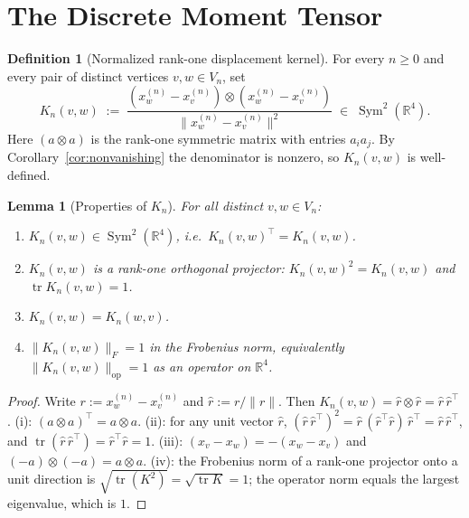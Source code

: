 \documentclass[11pt, a4paper]{amsart}
\newtheorem{lemma}[theorem]{Lemma}
\theoremstyle{definition}
\newtheorem{definition}[theorem]{Definition}
\newcommand{\R}{\mathbb{R}}
\newcommand{\tr}{\operatorname{tr}}
\newcommand{\op}{\operatorname{op}}
\newcommand{\Sym}{\operatorname{Sym}}
\begin{document}
\section{The Discrete Moment Tensor}
\label{sec:moment}

\begin{definition}[Normalized rank-one displacement kernel]
\label{def:kernel}
For every $n \geq 0$ and every pair of distinct vertices
$v, w \in V_n$, set
\[
  K_n(v, w) \;:=\;
    \frac{(x_w^{(n)} - x_v^{(n)}) \otimes
      (x_w^{(n)} - x_v^{(n)})}{\|x_w^{(n)} - x_v^{(n)}\|^2}
  \;\in\; \Sym^2(\R^4).
\]
Here $(a \otimes a)$ is the rank-one symmetric matrix with
entries $a_i a_j$. By Corollary~\ref{cor:nonvanishing} the
denominator is nonzero, so $K_n(v, w)$ is well-defined.
\end{definition}

\begin{lemma}[Properties of $K_n$]
\label{lem:kernel-properties}
For all distinct $v, w \in V_n$:
\begin{enumerate}
\item[\textup{(i)}] $K_n(v, w) \in \Sym^2(\R^4)$, i.e.\
  $K_n(v, w)^\top = K_n(v, w)$.
\item[\textup{(ii)}] $K_n(v, w)$ is a rank-one orthogonal
  projector: $K_n(v, w)^2 = K_n(v, w)$ and
  $\tr K_n(v, w) = 1$.
\item[\textup{(iii)}] $K_n(v, w) = K_n(w, v)$.
\item[\textup{(iv)}] $\|K_n(v, w)\|_F = 1$ in the Frobenius
  norm, equivalently $\|K_n(v, w)\|_\op = 1$ as an operator on
  $\R^4$.
\end{enumerate}
\end{lemma}

\begin{proof}
Write $r := x_w^{(n)} - x_v^{(n)}$ and $\hat r := r / \|r\|$.
Then $K_n(v, w) = \hat r \otimes \hat r = \hat r\,\hat r^\top$.
(i): $(a \otimes a)^\top = a \otimes a$. (ii): for any unit
vector $\hat r$, $(\hat r\,\hat r^\top)^2 = \hat r\,(\hat r^\top
\hat r)\,\hat r^\top = \hat r\,\hat r^\top$, and $\tr(\hat r\,
\hat r^\top) = \hat r^\top \hat r = 1$. (iii):
$(x_v - x_w) = -(x_w - x_v)$ and $(-a) \otimes (-a) = a \otimes
a$. (iv): the Frobenius norm of a rank-one projector onto a unit
direction is $\sqrt{\tr(K^2)} = \sqrt{\tr K} = 1$; the operator
norm equals the largest eigenvalue, which is $1$.
\end{proof}
\end{document}
